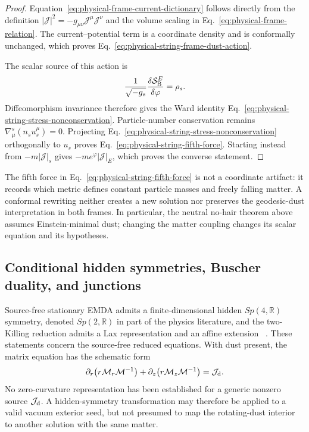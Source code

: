 \begin{proof}
Equation~\eqref{eq:physical-frame-current-dictionary} follows directly
from the definition
$|\mathcal J|^2=-g_{\mu\nu}\mathcal J^\mu\mathcal J^\nu$ and the volume
scaling in Eq.~\eqref{eq:physical-frame-relation}. The current--potential
term is a coordinate density and is conformally unchanged, which proves
Eq.~\eqref{eq:physical-string-frame-dust-action}.

The scalar source of this action is
\begin{equation}
 \frac{1}{\sqrt{-g_s}}
 \frac{\delta\mathcal S_{\rm B}^{E}}{\delta\varphi}=\rho_s.
 \label{eq:physical-string-scalar-source}
\end{equation}
Diffeomorphism invariance therefore gives the Ward identity
Eq.~\eqref{eq:physical-string-stress-nonconservation}. Particle-number
conservation remains $\nabla^s_\mu(n_s u_s^\mu)=0$. Projecting
Eq.~\eqref{eq:physical-string-stress-nonconservation} orthogonally to
$u_s$ proves Eq.~\eqref{eq:physical-string-fifth-force}. Starting instead
from $-m|\mathcal J|_s$ gives
$-me^{\varphi}|\mathcal J|_E$, which proves the converse statement.
\end{proof}

The fifth force in Eq.~\eqref{eq:physical-string-fifth-force} is not a
coordinate artifact: it records which metric defines constant particle
masses and freely falling matter. A conformal rewriting neither creates a
new solution nor preserves the geodesic-dust interpretation in both frames.
In particular, the neutral no-hair theorem above assumes Einstein-minimal
dust; changing the matter coupling changes its scalar equation and its
hypotheses.

\subsection{Conditional hidden symmetries, Buscher duality, and junctions}

Source-free stationary EMDA admits a finite-dimensional hidden
$Sp(4,\mathbb R)$ symmetry, denoted $Sp(2,\mathbb R)$ in part of the physics
literature, and the two-Killing reduction admits a Lax representation and
an affine extension
~\cite{GaltsovKechkin1994PRD,Galtsov1995PRL}. These statements concern the
source-free reduced equations. With dust present, the matrix equation has
the schematic form
\begin{equation}
 \partial_r\!\left(r\mathcal M_r\mathcal M^{-1}\right)
 +\partial_z\!\left(r\mathcal M_z\mathcal M^{-1}\right)
 =\mathcal J_{\rm d}.
 \label{eq:physical-sourced-EMDA-matrix-equation}
\end{equation}
No zero-curvature representation has been established for a generic
nonzero source $\mathcal J_{\rm d}$. A hidden-symmetry transformation may
therefore be applied to a valid vacuum exterior seed, but not presumed to
map the rotating-dust interior to another solution with the same matter.

